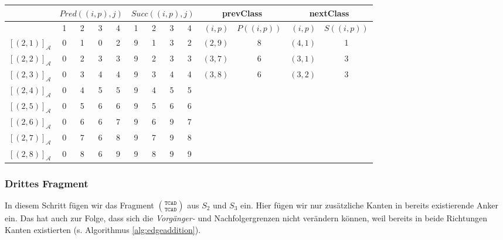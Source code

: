 \vspace{5pt}
\small
\begin{tabular}{r|cccc|cccc||r|c|r|c}
	& \multicolumn{4}{c|}{$Pred((i,p),j)$} & \multicolumn{4}{c||}{$Succ((i,p),j)$} & \multicolumn{2}{c|}{\textrm{prevClass}} & \multicolumn{2}{c}{\textrm{nextClass}} \\ \hline
	\diagbox[dir=NW]{$(i,p)$}{$j$} & 1 & 2 & 3 & 4 & 1 & 2 & 3 & 4 & $(i,p)$ & $P((i,p))$ & $(i,p)$ & $S((i,p))$ \\ \hline
	$[(2,1)]_{\mathcal{A}}$ & 0 & 1 & 0 & 2 & 9 & 1 & 3 & 2 & $(2,9)$ & 8 & $(4,1)$ & 1 \\
	$[(2,2)]_{\mathcal{A}}$ & 0 & 2 & 3 & 3 & 9 & 2 & 3 & 3 & $(3,7)$ & 6 & $(3,1)$ & 3 \\
	$[(2,3)]_{\mathcal{A}}$ & 0 & 3 & 4 & 4 & 9 & 3 & 4 & 4 & $(3,8)$ & 6 & $(3,2)$ & 3 \\
	$[(2,4)]_{\mathcal{A}}$ & 0 & 4 & 5 & 5 & 9 & 4 & 5 & 5 & & & & \\
	$[(2,5)]_{\mathcal{A}}$ & 0 & 5 & 6 & 6 & 9 & 5 & 6 & 6 & & & & \\
	$[(2,6)]_{\mathcal{A}}$ & 0 & 6 & 6 & 7 & 9 & 6 & 9 & 7 & & & & \\
	$[(2,7)]_{\mathcal{A}}$ & 0 & 7 & 6 & 8 & 9 & 7 & 9 & 8 & & & & \\
	$[(2,8)]_{\mathcal{A}}$ & 0 & 8 & 6 & 9 & 9 & 8 & 9 & 9 & & & &
\end{tabular}
\normalsize

\subsubsection{Drittes Fragment}

In diesem Schritt fügen wir das Fragment ${\texttt{TCAD}}\choose{\texttt{TCAD}}$ aus $S_2$ und $S_3$ ein. Hier fügen wir nur zusätzliche Kanten in bereits existierende Anker ein. Das hat auch zur Folge, dass sich die \emph{Vorgänger-} und Nachfolgergrenzen nicht verändern können, weil bereits in beide Richtungen Kanten existierten (s. Algorithmus \ref{alg:edgeaddition}).

